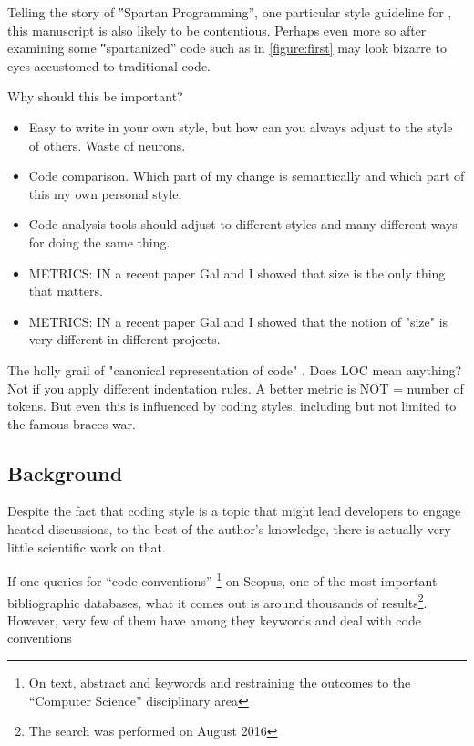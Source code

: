 Telling the story of ‟Spartan Programming”, one particular style guideline for
\Java, this manuscript is also likely to be contentious. Perhaps even more so
after examining some ‟spartanized” code such as in \cref{figure:first} 
may look bizarre to eyes accustomed to traditional \Java code.

Why should this be important?
\begin{itemize}
    \item Easy to write in your own style, but how can
      you always adjust to the style of others.
      Waste of neurons.
    \item Code comparison. Which part of my change is semantically and which
      part of this my own personal style.
    \item Code analysis tools should adjust to different styles and many
        different ways for doing the same thing.
    \item METRICS: IN a recent paper Gal and I showed that size
      is the only thing that matters.
    \item METRICS: IN a recent paper Gal and I showed that the notion of
      "size" is very different in different projects.
\end{itemize}

The holly grail of "canonical representation of code" .
Does LOC mean anything?
Not if you apply different indentation rules.
A better metric is NOT = number of tokens.
But even this is influenced by coding styles, including but
not limited to the famous braces war.

\subsection{Background}

Despite the fact that coding style is a topic that might lead developers to engage heated 
discussions, to the best of the author's knowledge, there is actually very little scientific 
work on that. 

If one queries for ``code conventions''
\footnote{On text, abstract and keywords and restraining the outcomes to the ``Computer Science''
disciplinary area} 
on Scopus, one of the most important bibliographic databases, what it comes out is around 
thousands of results\footnote{The search was performed on August 2016}. 
However, very few of them  have  among they
keywords and deal with code conventions

